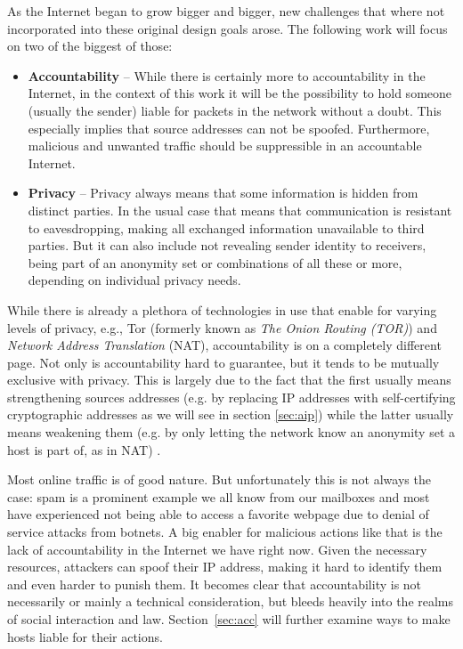 \documentclass{acm_proc_article-sp}
\begin{document}
As the Internet began to grow bigger and bigger, new challenges that where not incorporated into these original design goals arose. The following work will focus on two of the biggest of those:
\begin{itemize}
	\item \textbf{Accountability} -- While there is certainly more to accountability in the Internet, in the context of this work it will be the possibility to hold someone (usually the sender) liable for packets in the network without a doubt. This especially implies that source addresses can not be spoofed. Furthermore, malicious and unwanted traffic should be suppressible in an accountable Internet.
	\item \textbf{Privacy} -- Privacy always means that some information is hidden from distinct parties. In the usual case that means that communication is resistant to eavesdropping, making all exchanged information unavailable to third parties. But it can also include not revealing sender identity to receivers, being part of an anonymity set or combinations of all these or more, depending on individual privacy needs.
\end{itemize}

While there is already a plethora of technologies in use that enable for varying levels of privacy, e.g., Tor (formerly known as \emph{The Onion Routing (TOR)}) and \emph{Network Address Translation} (NAT), accountability is on a completely different page. Not only is accountability hard to guarantee, but it tends to be mutually exclusive with privacy. This is largely due to the fact that the first usually means strengthening sources addresses (e.g. by replacing IP addresses with self-certifying cryptographic addresses as we will see in section \ref{sec:aip}) while the latter usually means weakening them (e.g. by only letting the network know an anonymity set a host is part of, as in NAT) \cite{apip}.

Most online traffic is of good nature. But unfortunately this is not always the case: spam is a prominent example we all know from our mailboxes and most have experienced not being able to access a favorite webpage due to denial of service attacks from botnets. A big enabler for malicious actions like that is the lack of accountability in the Internet we have right now. Given the necessary resources, attackers can spoof their IP address, making it hard to identify them and even harder to punish them. It becomes clear that accountability is not necessarily or mainly a technical consideration, but bleeds heavily into the realms of social interaction and law. Section~\ref{sec:acc} will further examine ways to make hosts liable for their actions.
\end{document}
